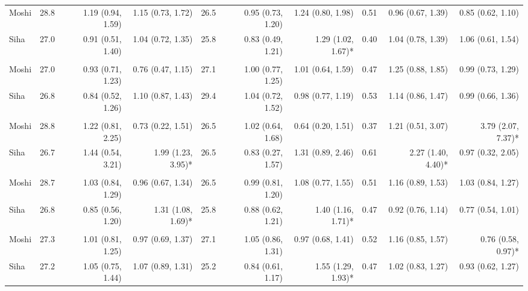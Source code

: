 \begin{table}[t]
\begin{tabular*}{\linewidth}{@{\extracolsep{\fill}}l|rrrrrrrrr}
\midrule\addlinespace[2.5pt]
\multicolumn{10}{l}{Poisoning} \\[2.5pt] 
\midrule\addlinespace[2.5pt]
Moshi & 28.8 & 1.19 (0.94, 1.59)  & 1.15 (0.73, 1.72)  & 26.5 & 0.95 (0.73, 1.20)  & 1.24 (0.80, 1.98)  & 0.51 & 0.96 (0.67, 1.39)  & 0.85 (0.62, 1.10)  \\ 
Siha & 27.0 & 0.91 (0.51, 1.40)  & 1.04 (0.72, 1.35)  & 25.8 & 0.83 (0.49, 1.21)  & 1.29 (1.02, 1.67)* & 0.40 & 1.04 (0.78, 1.39)  & 1.06 (0.61, 1.54)  \\ 
\midrule\addlinespace[2.5pt]
\multicolumn{10}{l}{Snake and Insect Bites} \\[2.5pt] 
\midrule\addlinespace[2.5pt]
Moshi & 27.0 & 0.93 (0.71, 1.23)  & 0.76 (0.47, 1.15)  & 27.1 & 1.00 (0.77, 1.25)  & 1.01 (0.64, 1.59)  & 0.47 & 1.25 (0.88, 1.85)  & 0.99 (0.73, 1.29)  \\ 
Siha & 26.8 & 0.84 (0.52, 1.26)  & 1.10 (0.87, 1.43)  & 29.4 & 1.04 (0.72, 1.52)  & 0.98 (0.77, 1.19)  & 0.53 & 1.14 (0.86, 1.47)  & 0.99 (0.66, 1.36)  \\ 
\midrule\addlinespace[2.5pt]
\multicolumn{10}{l}{Substance Abuse} \\[2.5pt] 
\midrule\addlinespace[2.5pt]
Moshi & 28.8 & 1.22 (0.81, 2.25)  & 0.73 (0.22, 1.51)  & 26.5 & 1.02 (0.64, 1.68)  & 0.64 (0.20, 1.51)  & 0.37 & 1.21 (0.51, 3.07)  & 3.79 (2.07, 7.37)* \\ 
Siha & 26.7 & 1.44 (0.54, 3.21)  & 1.99 (1.23, 3.95)* & 26.5 & 0.83 (0.27, 1.57)  & 1.31 (0.89, 2.46)  & 0.61 & 2.27 (1.40, 4.40)* & 0.97 (0.32, 2.05)  \\ 
\midrule\addlinespace[2.5pt]
\multicolumn{10}{l}{Fractures} \\[2.5pt] 
\midrule\addlinespace[2.5pt]
Moshi & 28.7 & 1.03 (0.84, 1.29)  & 0.96 (0.67, 1.34)  & 26.5 & 0.99 (0.81, 1.20)  & 1.08 (0.77, 1.55)  & 0.51 & 1.16 (0.89, 1.53)  & 1.03 (0.84, 1.27)  \\ 
Siha & 26.8 & 0.85 (0.56, 1.20)  & 1.31 (1.08, 1.69)* & 25.8 & 0.88 (0.62, 1.21)  & 1.40 (1.16, 1.71)* & 0.47 & 0.92 (0.76, 1.14)  & 0.77 (0.54, 1.01)  \\ 
\midrule\addlinespace[2.5pt]
\multicolumn{10}{l}{Road Traffic Accidents} \\[2.5pt] 
\midrule\addlinespace[2.5pt]
Moshi & 27.3 & 1.01 (0.81, 1.25)  & 0.97 (0.69, 1.37)  & 27.1 & 1.05 (0.86, 1.31)  & 0.97 (0.68, 1.41)  & 0.52 & 1.16 (0.85, 1.57)  & 0.76 (0.58, 0.97)* \\ 
Siha & 27.2 & 1.05 (0.75, 1.44)  & 1.07 (0.89, 1.31)  & 25.2 & 0.84 (0.61, 1.17)  & 1.55 (1.29, 1.93)* & 0.47 & 1.02 (0.83, 1.27)  & 0.93 (0.62, 1.27)  \\ 

\end{tabular*}
\end{table}
